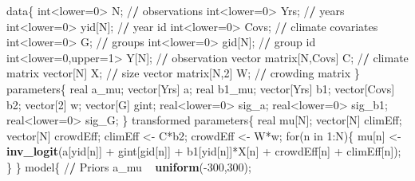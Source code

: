 \documentclass[12pt,]{article}
\newenvironment{Shaded}{\begin{snugshade}}{\end{snugshade}}
\newcommand{\KeywordTok}[1]{\textcolor[rgb]{0.13,0.29,0.53}{\textbf{{#1}}}}
\newcommand{\DecValTok}[1]{\textcolor[rgb]{0.00,0.00,0.81}{{#1}}}
\newcommand{\StringTok}[1]{\textcolor[rgb]{0.31,0.60,0.02}{{#1}}}
\newcommand{\ErrorTok}[1]{\textbf{{#1}}}
\newcommand{\NormalTok}[1]{{#1}}
\begin{document}
\begin{Shaded}
\begin{Highlighting}[]
\NormalTok{data\{}
  \NormalTok{int<lower=}\DecValTok{0}\NormalTok{>}\StringTok{ }\NormalTok{N; /}\ErrorTok{/}\StringTok{ }\NormalTok{observations}
  \NormalTok{int<lower=}\DecValTok{0}\NormalTok{>}\StringTok{ }\NormalTok{Yrs; /}\ErrorTok{/}\StringTok{ }\NormalTok{years}
  \NormalTok{int<lower=}\DecValTok{0}\NormalTok{>}\StringTok{ }\NormalTok{yid[N]; /}\ErrorTok{/}\StringTok{ }\NormalTok{year id}
  \NormalTok{int<lower=}\DecValTok{0}\NormalTok{>}\StringTok{ }\NormalTok{Covs; /}\ErrorTok{/}\StringTok{ }\NormalTok{climate covariates}
  \NormalTok{int<lower=}\DecValTok{0}\NormalTok{>}\StringTok{ }\NormalTok{G; /}\ErrorTok{/}\StringTok{ }\NormalTok{groups}
  \NormalTok{int<lower=}\DecValTok{0}\NormalTok{>}\StringTok{ }\NormalTok{gid[N]; /}\ErrorTok{/}\StringTok{ }\NormalTok{group id}
  \NormalTok{int<lower=}\DecValTok{0}\NormalTok{,upper=}\DecValTok{1}\NormalTok{>}\StringTok{ }\NormalTok{Y[N]; /}\ErrorTok{/}\StringTok{ }\NormalTok{observation vector}
  \NormalTok{matrix[N,Covs] C; /}\ErrorTok{/}\StringTok{ }\NormalTok{climate matrix}
  \NormalTok{vector[N] X; /}\ErrorTok{/}\StringTok{ }\NormalTok{size vector}
  \NormalTok{matrix[N,}\DecValTok{2}\NormalTok{] W; /}\ErrorTok{/}\StringTok{ }\NormalTok{crowding matrix}
\NormalTok{\}}
\NormalTok{parameters\{}
  \NormalTok{real a_mu;}
  \NormalTok{vector[Yrs] a;}
  \NormalTok{real b1_mu;}
  \NormalTok{vector[Yrs] b1;}
  \NormalTok{vector[Covs] b2;}
  \NormalTok{vector[}\DecValTok{2}\NormalTok{] w;}
  \NormalTok{vector[G] gint;}
  \NormalTok{real<lower=}\DecValTok{0}\NormalTok{>}\StringTok{ }\NormalTok{sig_a;}
  \NormalTok{real<lower=}\DecValTok{0}\NormalTok{>}\StringTok{ }\NormalTok{sig_b1;}
  \NormalTok{real<lower=}\DecValTok{0}\NormalTok{>}\StringTok{ }\NormalTok{sig_G;}
\NormalTok{\}}
\NormalTok{transformed parameters\{}
  \NormalTok{real mu[N];}
  \NormalTok{vector[N] climEff;}
  \NormalTok{vector[N] crowdEff;}
  \NormalTok{climEff <-}\StringTok{ }\NormalTok{C*b2;}
  \NormalTok{crowdEff <-}\StringTok{ }\NormalTok{W*w;}
  \NormalTok{for(n in }\DecValTok{1}\NormalTok{:N)\{}
    \NormalTok{mu[n] <-}\StringTok{ }\KeywordTok{inv_logit}\NormalTok{(a[yid[n]] +}\StringTok{ }\NormalTok{gint[gid[n]] +}\StringTok{ }\NormalTok{b1[yid[n]]*X[n] +}\StringTok{ }
\StringTok{                         }\NormalTok{crowdEff[n] +}\StringTok{ }\NormalTok{climEff[n]);}
  \NormalTok{\}}
\NormalTok{\}}
\NormalTok{model\{}
  \NormalTok{/}\ErrorTok{/}\StringTok{ }\NormalTok{Priors}
  \NormalTok{a_mu ~}\StringTok{ }\KeywordTok{uniform}\NormalTok{(-}\DecValTok{300}\NormalTok{,}\DecValTok{300}\NormalTok{);}

\end{Highlighting}
\end{Shaded}
\end{document}
